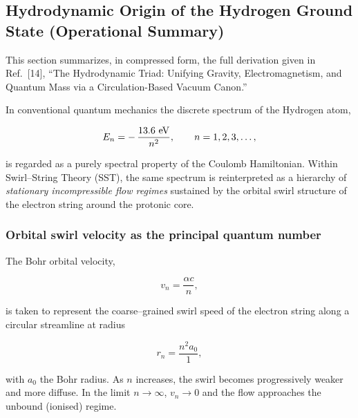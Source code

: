 \subsection{Hydrodynamic Origin of the Hydrogen Ground State (Operational Summary)}
    \label{sec:SST_hydrogen_groundstate}

    This section summarizes, in compressed form, the full derivation given in Ref.~[14], ``The Hydrodynamic Triad: Unifying Gravity, Electromagnetism, and Quantum Mass via a Circulation-Based Vacuum Canon.''

    In conventional quantum mechanics the discrete spectrum of the Hydrogen
    atom,

    \begin{equation}
        E_n = -\,\frac{13.6~{\rm eV}}{n^2},
        \qquad n=1,2,3,\ldots,
    \end{equation}

    is regarded as a purely spectral property of the Coulomb Hamiltonian.
    Within Swirl--String Theory (SST), the same spectrum is reinterpreted as
    a hierarchy of \emph{stationary incompressible flow regimes} sustained
    by the orbital swirl structure of the electron string around the
    protonic core.

    \subsubsection*{Orbital swirl velocity as the principal quantum number}

        The Bohr orbital velocity,

        \begin{equation}
            v_n = \frac{\alpha c}{n},
        \end{equation}

        is taken to represent the coarse--grained swirl speed of the electron
        string along a circular streamline at radius

        \begin{equation}
            r_n = \frac{n^2 a_0}{1},
        \end{equation}

        with $a_0$ the Bohr radius. As $n$ increases, the swirl becomes
        progressively weaker and more diffuse. In the limit $n\to\infty$,
        $v_n\to 0$ and the flow approaches the unbound (ionised) regime.

